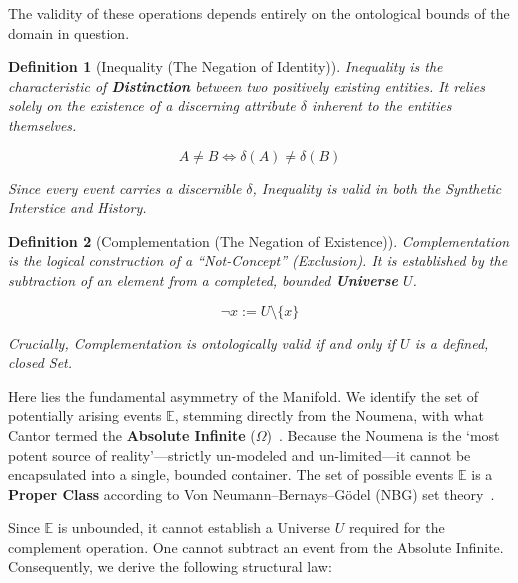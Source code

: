 \documentclass[11pt, a4paper]{article}
\theoremstyle{formalism}
\newtheorem{formalism}{Definition}
\begin{document}
The validity of these operations depends entirely on the ontological bounds of the domain in question.

\begin{formalism}[Inequality (The Negation of Identity)]
    Inequality is the characteristic of \textbf{Distinction} between two positively 
    existing entities. It relies solely on the existence of a discerning attribute 
    $\delta$ inherent to the entities themselves.
    
    \begin{equation}
        A \neq B \iff \delta(A) \neq \delta(B)
    \end{equation}
    
    Since every event carries a discernible $\delta$, Inequality is valid in 
    both the Synthetic Interstice and History.
\end{formalism}

\begin{formalism}[Complementation (The Negation of Existence)]
    Complementation is the logical construction of a ``Not-Concept'' (Exclusion). 
    It is established by the subtraction of an element from a completed, bounded 
    \textbf{Universe} $U$.
    
    \begin{equation}
        \neg x := U \setminus \{x\}
    \end{equation}
    
    Crucially, Complementation is ontologically valid \textit{if and only if} $U$ 
    is a defined, closed Set.
\end{formalism}

Here lies the fundamental asymmetry of the Manifold. We identify the set of potentially arising events $\mathbb{E}$, stemming directly from the Noumena, with what Cantor termed the \textbf{Absolute Infinite} ($\Omega$)~\cite{Cantor1899}. Because the Noumena is the `most potent source of reality'---strictly un-modeled and un-limited---it cannot be encapsulated into a single, bounded container. The set of possible events $\mathbb{E}$ is a \textbf{Proper Class} according to Von Neumann–Bernays–Gödel (NBG) set theory~\cite{VonNeumann1925}.

Since $\mathbb{E}$ is unbounded, it cannot establish a Universe $U$ required for the complement operation. One cannot subtract an event from the Absolute Infinite. Consequently, we derive the following structural law:
\end{document}
